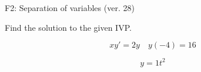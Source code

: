 \begin{exercise}
  \begin{exerciseTitle}F2: Separation of variables (ver. 28)\end{exerciseTitle}
  \begin{exerciseStatement}
    
Find the solution to the given IVP.

    
\[xy'= 2 y \hspace{1em} y( -4 ) = 16\]

  \end{exerciseStatement}
  \begin{exerciseAnswer}
    
\[y= 1 t^ 2\]

  \end{exerciseAnswer}
\end{exercise}